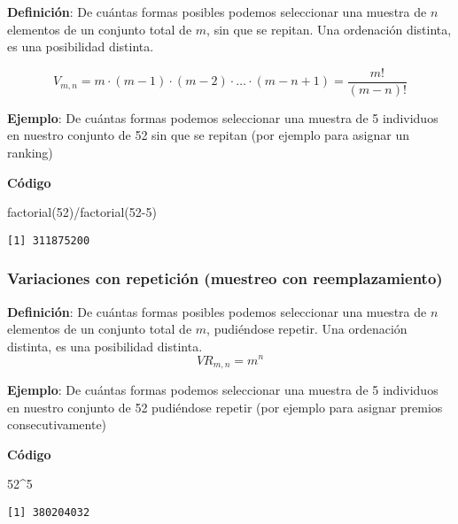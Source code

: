 \documentclass[
]{article}
\newenvironment{Shaded}{\begin{snugshade}}{\end{snugshade}}
\newcommand{\DecValTok}[1]{\textcolor[rgb]{0.00,0.00,0.81}{#1}}
\newcommand{\FunctionTok}[1]{\textcolor[rgb]{0.00,0.00,0.00}{#1}}
\newcommand{\NormalTok}[1]{#1}
\newcommand{\SpecialCharTok}[1]{\textcolor[rgb]{0.00,0.00,0.00}{#1}}
\begin{document}
\textbf{Definición}: De cuántas formas posibles podemos seleccionar una
muestra de \(n\) elementos de un conjunto total de \(m\), sin que se
repitan. Una ordenación distinta, es una posibilidad distinta.

\[V_{m,n} = m\cdot(m-1)\cdot(m-2)\cdot\ldots\cdot (m-n+1) = \frac{m!}{(m-n)!}\]

\textbf{Ejemplo}: De cuántas formas podemos seleccionar una muestra de 5
individuos en nuestro conjunto de 52 sin que se repitan (por ejemplo
para asignar un ranking)

\textbf{Código}

\begin{Shaded}
\begin{Highlighting}[]
\FunctionTok{factorial}\NormalTok{(}\DecValTok{52}\NormalTok{)}\SpecialCharTok{/}\FunctionTok{factorial}\NormalTok{(}\DecValTok{52{-}5}\NormalTok{)}
\end{Highlighting}
\end{Shaded}

\begin{verbatim}
[1] 311875200
\end{verbatim}

\hypertarget{variaciones-con-repeticiuxf3n-muestreo-con-reemplazamiento}{%
\subsubsection{Variaciones con repetición (muestreo con
reemplazamiento)}\label{variaciones-con-repeticiuxf3n-muestreo-con-reemplazamiento}}

\textbf{Definición}: De cuántas formas posibles podemos seleccionar una
muestra de \(n\) elementos de un conjunto total de \(m\), pudiéndose
repetir. Una ordenación distinta, es una posibilidad distinta.
\[\mathit{VR}_{m,n} = m^n\]

\textbf{Ejemplo}: De cuántas formas podemos seleccionar una muestra de 5
individuos en nuestro conjunto de 52 pudiéndose repetir (por ejemplo
para asignar premios consecutivamente)

\textbf{Código}

\begin{Shaded}
\begin{Highlighting}[]
\DecValTok{52}\SpecialCharTok{\^{}}\DecValTok{5}
\end{Highlighting}
\end{Shaded}

\begin{verbatim}
[1] 380204032
\end{verbatim}
\end{document}
